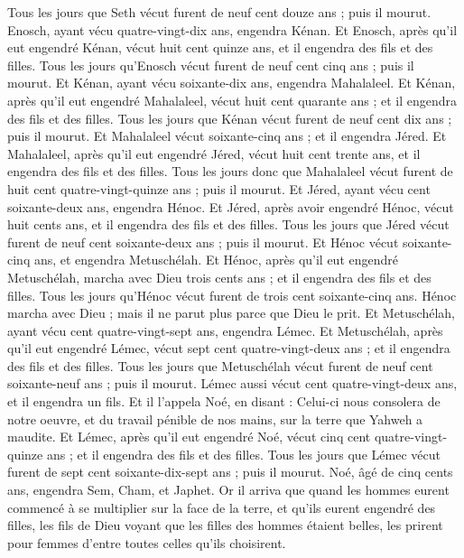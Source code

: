\begin{multicols}{2}
Tous les jours que Seth vécut furent de neuf cent douze ans ; puis il mourut.
Enosch, ayant vécu quatre-vingt-dix ans, engendra Kénan.
Et Enosch, après qu'il eut engendré Kénan, vécut huit cent quinze ans, et il engendra des fils et des filles.
Tous les jours qu'Enosch vécut furent de neuf cent cinq ans ; puis il mourut.
Et Kénan, ayant vécu soixante-dix ans, engendra Mahalaleel.
Et Kénan, après qu'il eut engendré Mahalaleel, vécut huit cent quarante ans ; et il engendra des fils et des filles.
Tous les jours que Kénan vécut furent de neuf cent dix ans ; puis il mourut.
Et Mahalaleel vécut soixante-cinq ans ; et il engendra Jéred.
Et Mahalaleel, après qu'il eut engendré Jéred, vécut huit cent trente ans, et il engendra des fils et des filles.
Tous les jours donc que Mahalaleel vécut furent de huit cent quatre-vingt-quinze ans ; puis il mourut.
Et Jéred, ayant vécu cent soixante-deux ans, engendra Hénoc.
Et Jéred, après avoir engendré Hénoc, vécut huit cents ans, et il engendra des fils et des filles.
Tous les jours que Jéred vécut furent de neuf cent soixante-deux ans ; puis il mourut.
Et Hénoc vécut soixante-cinq ans, et engendra Metuschélah.
Et Hénoc, après qu'il eut engendré Metuschélah, marcha avec Dieu trois cents ans ; et il engendra des fils et des filles.
Tous les jours qu'Hénoc vécut furent de trois cent soixante-cinq ans.
Hénoc marcha avec Dieu ; mais il ne parut plus parce que Dieu le prit.
Et Metuschélah, ayant vécu cent quatre-vingt-sept ans, engendra Lémec.
Et Metuschélah, après qu'il eut engendré Lémec, vécut sept cent quatre-vingt-deux ans ; et il engendra des fils et des filles.
Tous les jours que Metuschélah vécut furent de neuf cent soixante-neuf ans ; puis il mourut.
Lémec aussi vécut cent quatre-vingt-deux ans, et il engendra un fils.
Et il l'appela Noé, en disant : Celui-ci nous consolera de notre oeuvre, et du travail pénible de nos mains, sur la terre que Yahweh a maudite.
Et Lémec, après qu'il eut engendré Noé, vécut cinq cent quatre-vingt-quinze ans ; et il engendra des fils et des filles.
Tous les jours que Lémec vécut furent de sept cent soixante-dix-sept ans ; puis il mourut.
Noé, âgé de cinq cents ans, engendra Sem, Cham, et Japhet.
\VerseOne{}Or il arriva que quand les hommes eurent commencé à se multiplier sur la face de la terre, et qu'ils eurent engendré des filles,
les fils de Dieu voyant que les filles des hommes étaient belles, les prirent pour femmes d'entre toutes celles qu'ils choisirent.

\end{multicols}
